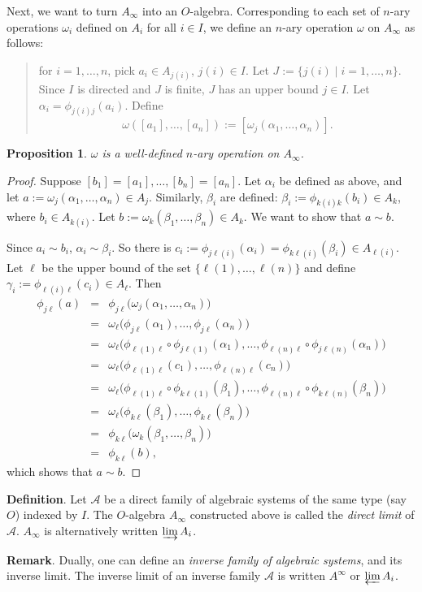 \documentclass[12pt]{article}
\newtheorem{prop}{Proposition}
\begin{document}
Next, we want to turn $A_{\infty}$ into an $O$-algebra.  Corresponding to each set of $n$-ary operations $\omega_i$ defined on $A_i$ for all $i\in I$, we define an $n$-ary operation $\omega$ on $A_{\infty}$ as follows:
\begin{quote}
for $i=1,\ldots,n$, pick $a_i\in A_{j(i)}$, $j(i)\in I$.  Let $J:=\lbrace j(i)\mid i=1,\ldots,n\rbrace$.  Since $I$ is directed and $J$ is finite, $J$ has an upper bound $j\in I$.  Let $\alpha_i=\phi_{j(i)j}(a_i)$.  Define
$$\omega([a_1],\ldots,[a_n]):=[\omega_j(\alpha_1,\ldots,\alpha_n)].$$
\end{quote}

\begin{prop} $\omega$ is a well-defined $n$-ary operation on $A_{\infty}$. \end{prop}
\begin{proof}  Suppose $[b_1]=[a_1],\ldots, [b_n]=[a_n]$.  Let $\alpha_i$ be defined as above, and let $a:=\omega_j(\alpha_1,\ldots,\alpha_n)\in A_j$.  Similarly, $\beta_i$ are defined: $\beta_i:=\phi_{k(i)k}(b_i)\in A_k$, where $b_i\in A_{k(i)}$.  Let $b:=\omega_k(\beta_1,\ldots,\beta_n)\in A_k$.  We want to show that $a\sim b$.  

Since $a_i\sim b_i$, $\alpha_i\sim \beta_i$.  So there is $c_i:= \phi_{j\ell(i)}(\alpha_i)=\phi_{k\ell(i)}(\beta_i)\in A_{\ell(i)}$.  Let $\ell$ be the upper bound of the set $\lbrace \ell(1),\ldots,\ell(n)\rbrace$ and define $\gamma_i:=\phi_{\ell(i)\ell}(c_i)\in A_{\ell}$.  Then 
\begin{eqnarray*}
\phi_{j\ell}(a)&=& 
\phi_{j\ell}\big(\omega_j(\alpha_1,\ldots,\alpha_n)\big) \\ &=& 
\omega_{\ell}\big(\phi_{j\ell}(\alpha_1),\ldots,\phi_{j\ell}(\alpha_n)\big) \\ &=& \omega_{\ell}\big(\phi_{\ell(1)\ell}\circ \phi_{j\ell(1)}(\alpha_1),\ldots, \phi_{\ell(n)\ell}\circ \phi_{j\ell(n)}(\alpha_n)\big) \\ &=& 
\omega_{\ell}\big(\phi_{\ell(1)\ell}(c_1),\ldots,\phi_{\ell(n)\ell}(c_n)\big) \\ &=& \omega_{\ell}\big(\phi_{\ell(1)\ell}\circ \phi_{k\ell(1)}(\beta_1),\ldots, \phi_{\ell(n)\ell}\circ \phi_{k\ell(n)}(\beta_n)\big) \\ &=& 
\omega_{\ell}\big(\phi_{k\ell}(\beta_1),\ldots,\phi_{k\ell}(\beta_n)\big) \\ &=& \phi_{k\ell}\big(\omega_k(\beta_1,\ldots,\beta_n)\big) \\ &=& \phi_{k\ell}(b),
\end{eqnarray*}
which shows that $a\sim b$.
\end{proof}

\textbf{Definition}.  Let $\mathcal{A}$ be a direct family of algebraic systems of the same type (say $O$) indexed by $I$.  The $O$-algebra $A_{\infty}$ constructed above is called the \emph{direct limit} of $\mathcal{A}$.  $A_{\infty}$ is alternatively written $\varinjlim A_i$.

\textbf{Remark}.  Dually, one can define an \emph{inverse family of algebraic systems}, and its inverse limit.  The inverse limit of an inverse family $\mathcal{A}$ is written $A^{\infty}$ or $\varprojlim A_i$.
\end{document}
